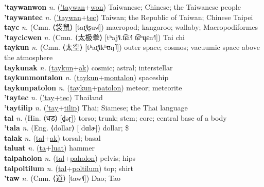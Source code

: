 \textbf{'taywanwon} \textit{n.} (\hyperref['taywan]{'taywan}+\hyperref[won]{won})
Taiwanese; Chinese; the Taiwanese people \label{'taywanwon} \\
\textbf{'taywantec} \textit{n.} (\hyperref['taywan]{'taywan}+\hyperref[tec]{tec})
Taiwan; the Republic of Taiwan; Chinese Taipei \label{'taywantec} \\
\textbf{tayc} \textit{n.} (Cmn. ⟨袋鼠⟩ [taɪ̯˥˩ʂu˧˩˧])
macropod; kangaroo; wallaby; Macropodiformes \label{tayc} \\
\textbf{'taycicwen} \textit{n.} (Cmn. ⟨太极拳⟩ [tʰaj˥˩.t͡ɕi˧˥ t͡ɕʰɥɛn˧˥])
Tai chi \label{'taycicwen} \\
\textbf{taykun} \textit{n.} (Cmn. ⟨太空⟩ [tʰaɪ̯˥˩kʰʊŋ˥])
outer space; cosmos; vacuumic space above the atmosphere \label{taykun} \\
\textbf{taykunak} \textit{n.} (\hyperref[taykun]{taykun}+\hyperref[ak]{ak})
cosmic; astral; interstellar \label{taykunak} \\
\textbf{taykunmontalon} \textit{n.} (\hyperref[taykun]{taykun}+\hyperref[montalon]{montalon})
spaceship \label{taykunmontalon} \\
\textbf{taykunpatolon} \textit{n.} (\hyperref[taykun]{taykun}+\hyperref[patolon]{patolon})
meteor; meteorite \label{taykunpatolon} \\
\textbf{'taytec} \textit{n.} (\hyperref['tay]{'tay}+\hyperref[tec]{tec})
Thailand \label{'taytec} \\
\textbf{'taytilip} \textit{n.} (\hyperref['tay]{'tay}+\hyperref[tilip]{tilip})
Thai; Siamese; the Thai language \label{'taytilip} \\
\textbf{tal} \textit{n.} (Hin. ⟨धड़⟩ [d̤əɽ])
torso; trunk; stem; core; central base of a body \label{tal} \\
\textbf{'tala} \textit{n.} (Eng. ⟨dollar⟩ [ˈdɑlɚ])
dollar; \$ \label{'tala} \\
\textbf{talak} \textit{n.} (\hyperref[tal]{tal}+\hyperref[ak]{ak})
torsal; basal \label{talak} \\
\textbf{taluat} \textit{n.} (\hyperref[ta]{ta}+\hyperref[luat]{luat})
hammer \label{taluat} \\
\textbf{talpaholon} \textit{n.} (\hyperref[tal]{tal}+\hyperref[paholon]{paholon})
pelvis; hips \label{talpaholon} \\
\textbf{talpoltilum} \textit{n.} (\hyperref[tal]{tal}+\hyperref[poltilum]{poltilum})
top; shirt \label{talpoltilum} \\
\textbf{'taw} \textit{n.} (Cmn. ⟨道⟩ [taw˥˩])
Dao; Tao \label{'taw} \\

